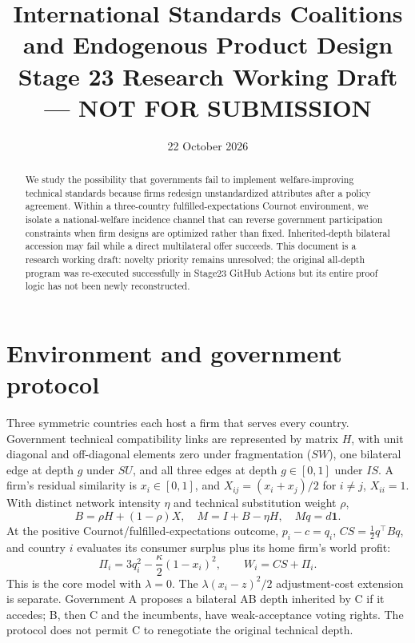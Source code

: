 \documentclass[11pt,a4paper]{article}
\title{International Standards Coalitions and Endogenous Product Design\\\large Stage 23 Research Working Draft --- NOT FOR SUBMISSION}
\date{22 October 2026}
\begin{document}
\maketitle
\begin{abstract}
We study the possibility that governments fail to implement welfare-improving technical standards because firms redesign unstandardized attributes after a policy agreement. Within a three-country fulfilled-expectations Cournot environment, we isolate a national-welfare incidence channel that can reverse government participation constraints when firm designs are optimized rather than fixed. Inherited-depth bilateral accession may fail while a direct multilateral offer succeeds. This document is a research working draft: novelty priority remains unresolved; the original all-depth program was re-executed successfully in Stage23 GitHub Actions but its entire proof logic has not been newly reconstructed.
\end{abstract}
\section{Environment and government protocol}
Three symmetric countries each host a firm that serves every country. Government technical compatibility links are represented by matrix $H$, with unit diagonal and off-diagonal elements zero under fragmentation ($SW$), one bilateral edge at depth $g$ under $SU$, and all three edges at depth $g\in[0,1]$ under $IS$. A firm's residual similarity is $x_i\in[0,1]$, and $X_{ij}=(x_i+x_j)/2$ for $i\ne j$, $X_{ii}=1$. With distinct network intensity $\eta$ and technical substitution weight $\rho$,
\[
 B=\rho H+(1-\rho)X,\quad M=I+B-\eta H,\quad Mq=d\mathbf1.
\]
At the positive Cournot/fulfilled-expectations outcome, $p_i-c=q_i$, $CS=\frac12q^\top Bq$, and country $i$ evaluates its consumer surplus plus its home firm's world profit:
\[
 \Pi_i=3q_i^2-\frac{\kappa}{2}(1-x_i)^2,\qquad W_i=CS+\Pi_i.
\]
This is the core model with $\lambda=0$. The $\lambda(x_i-z)^2/2$ adjustment-cost extension is separate. Government A proposes a bilateral AB depth inherited by C if it accedes; B, then C and the incumbents, have weak-acceptance voting rights. The protocol does not permit C to renegotiate the original technical depth.
\end{document}
